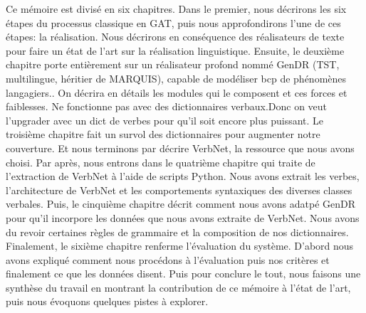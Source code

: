 Ce mémoire est divisé en six chapitres. Dans le premier, nous décrirons les six étapes du processus classique en \ac{GAT}, puis nous approfondirons l'une de ces étapes: la réalisation. Nous décrirons en conséquence des réalisateurs de texte pour faire un état de l'art sur la réalisation linguistique. Ensuite, le deuxième chapitre porte entièrement sur un réalisateur profond nommé GenDR (TST, multilingue, héritier de MARQUIS), capable de modéliser bcp de phénomènes langagiers.. On décrira en détails les modules qui le composent et ces forces et faiblesses. Ne fonctionne pas avec des dictionnaires verbaux.Donc on veut l'upgrader avec un dict de verbes pour qu'il soit encore plus puissant. Le troisième chapitre fait un survol des dictionnaires pour augmenter notre couverture. Et nous terminons par décrire VerbNet, la ressource que nous avons choisi. Par après, nous entrons dans le quatrième chapitre qui traite de l'extraction de VerbNet à l'aide de scripts Python. Nous avons extrait les verbes, l'architecture de VerbNet et les comportements syntaxiques des diverses classes verbales. Puis, le cinquième chapitre décrit comment nous avons adatpé GenDR pour qu'il incorpore les données que nous avons extraite de VerbNet. Nous avons du revoir certaines règles de grammaire et la composition de nos dictionnaires. Finalement, le sixième chapitre renferme l'évaluation du système. D'abord nous avons expliqué comment nous procédons à l'évaluation puis nos critères et finalement ce que les données disent. Puis pour conclure le tout, nous faisons une synthèse du travail en montrant la contribution de ce mémoire à l'état de l'art, puis nous évoquons quelques pistes à explorer.



